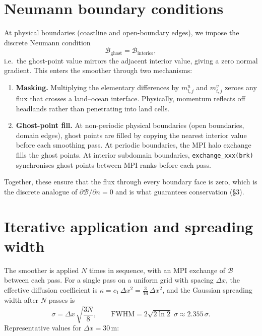 \documentclass[11pt]{article}
\begin{document}
\section{Neumann boundary conditions}
\label{sec:neumann}

At physical boundaries (coastline and open-boundary edges), we impose the
discrete Neumann condition
\begin{equation}
  \mathcal{B}_{\text{ghost}} = \mathcal{B}_{\text{interior}},
\end{equation}
i.e.\ the ghost-point value mirrors the adjacent interior value, giving a
zero normal gradient. This enters the smoother through two mechanisms:

\begin{enumerate}
\item \textbf{Masking.} Multiplying the elementary differences by $m^u_{i,j}$
  and $m^v_{i,j}$ zeroes any flux that crosses a land--ocean interface.
  Physically, momentum reflects off headlands rather than penetrating into
  land cells.

\item \textbf{Ghost-point fill.} At non-periodic physical boundaries
  (open boundaries, domain edges), ghost points are filled by copying the
  nearest interior value before each smoothing pass. At periodic boundaries,
  the MPI halo exchange fills the ghost points. At interior subdomain
  boundaries, \texttt{exchange\_xxx(brk)} synchronises ghost points between
  MPI ranks before each pass.
\end{enumerate}

Together, these ensure that the flux through every boundary face is zero,
which is the discrete analogue of $\partial\mathcal{B}/\partial n = 0$ and
is what guarantees conservation (\S3).

\section{Iterative application and spreading width}

The smoother is applied $N$ times in sequence, with an MPI exchange of
$\mathcal{B}$ between each pass. For a single pass on a uniform grid with
spacing $\Delta x$, the effective diffusion coefficient is
$\kappa = c_1\,\Delta x^2 = \tfrac{3}{16}\,\Delta x^2$, and the Gaussian
spreading width after $N$ passes is
\begin{equation}
  \sigma = \Delta x\,\sqrt{\frac{3N}{8}}, \qquad
  \text{FWHM} = 2\sqrt{2\ln 2}\;\sigma \approx 2.355\,\sigma.
\end{equation}
Representative values for $\Delta x = 30$\,m:
\end{document}

